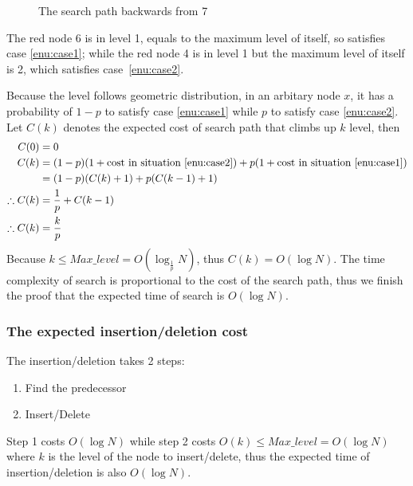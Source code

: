 \begin{figure}[H]
    \caption{The search path backwards from 7}\label{fig:back}
\end{figure}
The red node 6 is in level 1, equals to the maximum level of itself, so satisfies case \ref{enu:case1}; while the red node 4 is in level 1 but the maximum level of itself is 2, which satisfies \mbox{case \ref{enu:case2}.}\par
Because the level follows geometric distribution, in an arbitary node $x$, it has a probability of $1-p$ to satisfy case \ref{enu:case1} while $p$ to satisfy case \ref{enu:case2}. Let $C(k)$ denotes the expected cost of search path that climbs up $k$ level, then
\begin{align*}
    C(0) &= 0\\
    C(k) &= (1-p)(1+\text{cost in situation \ref{enu:case2}})+p(1+\text{cost in situation \ref{enu:case1}})\\
    &= (1-p)(C(k)+1) + p(C(k-1)+1)\\
    \therefore C(k) &= \frac{1}{p} + C(k-1)\\
    \therefore C(k) &= \frac{k}{p}
\end{align*}
Because $k\leq Max\_level = O(\log_{\frac 1p}{N})$, thus $C(k)=O(\log{N})$. The time complexity of search is proportional to the cost of the search path, thus we finish the proof that the expected time of search is $O(\log{N})$.
\subsubsection{The expected insertion/deletion cost}
The insertion/deletion takes 2 steps:
\begin{enumerate}
    \item Find the predecessor
    \item Insert/Delete
\end{enumerate}
Step 1 costs $O(\log{N})$ while step 2 costs $O(k)\leq Max\_level = O(\log{N})$ where $k$ is the level of the node to insert/delete, thus the expected time of insertion/deletion is also $O(\log{N})$.

